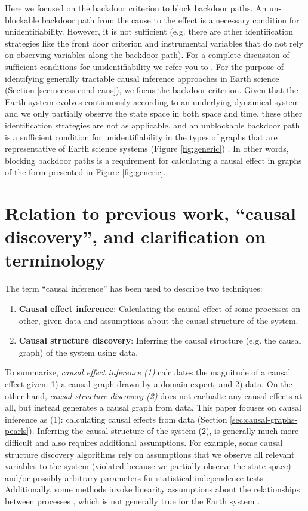 \documentclass[12pt]{article}
\begin{document}
Here we focused on the backdoor criterion to block backdoor paths. An
un-blockable backdoor path from the cause to the effect is a necessary
condition for unidentifiability. However, it is not sufficient
(e.g. there are other identification strategies like the front door
criterion and instrumental variables that do not rely on observing
variables along the backdoor path). For a complete discussion of
sufficient conditions for unidentifiability we refer you to
\citet{shpitser2006}. For the purpose of identifying generally
tractable causal inference approaches in Earth science (Section
\ref{sec:necess-cond-caus}), we focus the backdoor criterion. Given
that the Earth system evolves continuously according to an underlying
dynamical system and we only partially observe the state space in both
space and time, these other identification strategies are not as
applicable, and an unblockable backdoor path is a sufficient condition
for unidentifiability in the types of graphs that are representative
of Earth science systems (Figure \ref{fig:generic})
\citep{tian2002general}. In other words, blocking backdoor paths is a
requirement for calculating a causal effect in graphs of the form
presented in Figure \ref{fig:generic}.

\section{Relation to previous work, ``causal discovery'', and
  clarification on terminology}
\label{sec:discovery}

The term ``causal inference'' has been used to describe two
techniques:

\begin{enumerate}
\item \textbf{Causal effect inference}: Calculating the causal effect
  of some processes on other, given data and assumptions about the
  causal structure of the system.
\item \textbf{Causal structure discovery}: Inferring the causal
  structure (e.g. the causal graph) of the system using data.
\end{enumerate}

To summarize, \textit{causal effect inference (1)} calculates the
magnitude of a causal effect given: 1) a causal graph drawn by a
domain expert, and 2) data. On the other hand, \textit{causal
  structure discovery (2)} does not caclualte any causal effects at
all, but instead generates a causal graph from data.  This paper
focuses on causal inference as (1): calculating causal effects from
data (Section \ref{sec:causal-graphs-pearls}). Inferring the causal
structure of the system (2), is generally much more difficult and also
requires additional assumptions. For example, some causal structure
discovery algorithms rely on assumptions that we observe all relevant
variables to the system (violated because we partially observe the
state space) and/or possibly arbitrary parameters for statistical
independence tests \citep{runge2019inferring}. Additionally, some
methods invoke linearity assumptions about the relationships between
processes \citep{krich2019causal}, which is not generally true for the
Earth system \citep{palmer-nonlinaer-1999}.
\end{document}
